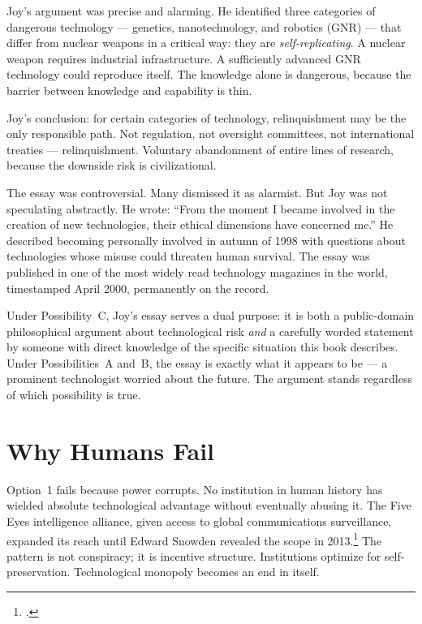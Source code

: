 Joy's argument was precise and alarming. He identified three categories of dangerous technology --- genetics, nanotechnology, and robotics (GNR) --- that differ from nuclear weapons in a critical way: they are \textit{self-replicating}. A nuclear weapon requires industrial infrastructure. A sufficiently advanced GNR technology could reproduce itself. The knowledge alone is dangerous, because the barrier between knowledge and capability is thin.

Joy's conclusion: for certain categories of technology, relinquishment may be the only responsible path. Not regulation, not oversight committees, not international treaties --- relinquishment. Voluntary abandonment of entire lines of research, because the downside risk is civilizational.

The essay was controversial. Many dismissed it as alarmist. But Joy was not speculating abstractly. He wrote: ``From the moment I became involved in the creation of new technologies, their ethical dimensions have concerned me.'' He described becoming personally involved in autumn of 1998 with questions about technologies whose misuse could threaten human survival. The essay was published in one of the most widely read technology magazines in the world, timestamped April 2000, permanently on the record.

Under Possibility~C, Joy's essay serves a dual purpose: it is both a public-domain philosophical argument about technological risk \textit{and} a carefully worded statement by someone with direct knowledge of the specific situation this book describes. Under Possibilities~A and~B, the essay is exactly what it appears to be --- a prominent technologist worried about the future. The argument stands regardless of which possibility is true.

\section*{Why Humans Fail}
\label{spine:wr-why-humans-fail}

Option~1 fails because power corrupts. No institution in human history has wielded absolute technological advantage without eventually abusing it. The Five Eyes intelligence alliance, given access to global communications surveillance, expanded its reach until Edward Snowden revealed the scope in 2013.\footcite{greenwald2014} The pattern is not conspiracy; it is incentive structure. Institutions optimize for self-preservation. Technological monopoly becomes an end in itself.

